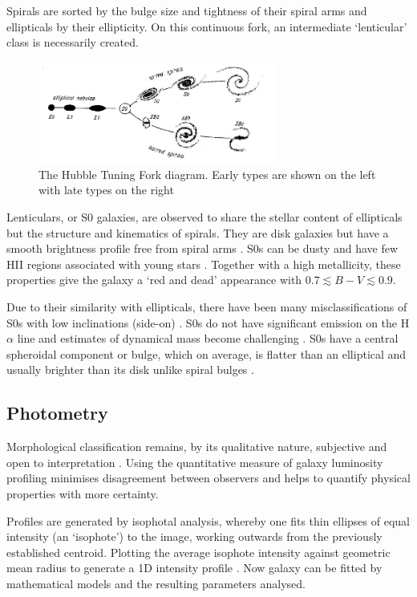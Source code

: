Spirals are sorted by the bulge size and tightness of their spiral arms and ellipticals by their ellipticity. On this continuous fork, an intermediate `lenticular' class is necessarily created. 
\begin{figure}[h]
	\centering
	\includegraphics[width=0.7\textwidth]{figs/Hubble_fork.jpg}
	\caption{The Hubble Tuning Fork diagram. Early types are shown on the left with late types on the right \citep{hubble_no._1926}}
	\label{hubble_fork}
\end{figure}
Lenticulars, or S0 galaxies, are observed to share the stellar content of ellipticals but the structure and kinematics of spirals. They are disk galaxies but have a smooth brightness profile free from spiral arms \citep{blanton_physical_2009}. S0s can be dusty and have few HII regions associated with young stars \citep{degraaff_galaxy_2007}. Together with a high metallicity, these properties give the galaxy a `red and dead' appearance with $0.7\lesssim B-V \lesssim 0.9$.

Due to their similarity with ellipticals, there have been many misclassifications of S0s with low inclinations (side-on) \citep{laurikainen_multicomponent_2005}. 
S0s do not have significant emission on the H$\alpha$ line and estimates of dynamical mass become challenging \citep{dressler_rotational_1983}. S0s have a central spheroidal component or bulge, which on average, is flatter than an elliptical and usually brighter than its disk unlike spiral bulges \citep{dressler_galaxy_1980}.

\subsection{Photometry}
Morphological classification remains, by its qualitative nature, subjective and open to interpretation \citep{naim_automated_1995}. Using the quantitative measure of galaxy luminosity profiling minimises disagreement between observers and helps to quantify physical properties with more certainty. 

Profiles are generated by isophotal analysis, whereby one fits thin ellipses of equal intensity (an `isophote') to the image, working outwards from the previously established centroid. Plotting the average isophote intensity against geometric mean radius to generate a 1D intensity profile \citep{peng_detailed_2002}. Now galaxy can be fitted by mathematical models and the resulting parameters analysed. 

